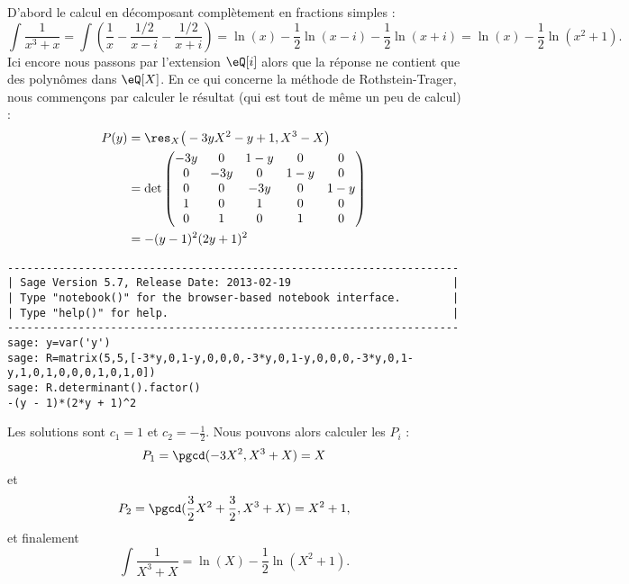 \begin{example}
    D'abord le calcul en décomposant complètement en fractions simples :
    \begin{equation}
        \int\frac{1}{ x^3+x }=\int\left( \frac{1}{ x }-\frac{ 1/2 }{ x-i }-\frac{ 1/2 }{ x+i } \right)=\ln(x)-\frac{ 1 }{2}\ln(x-i)-\frac{ 1 }{2}\ln(x+i)=\ln(x)-\frac{ 1 }{2}\ln(x^2+1).
    \end{equation}
    Ici encore nous passons par l'extension \( \eQ[i]\) alors que la réponse ne contient que des polynômes dans \( \eQ[X]\). En ce qui concerne la méthode de Rothstein-Trager, nous commençons par calculer le résultat (qui est tout de même un peu de calcul) :
    \begin{subequations}
        \begin{align}
        P(y)&=\res_X\big( -3yX^2-y+1,X^3-X \big)\\
        &=\det\begin{pmatrix}
            -3y    &   0    &   1-y    &   0    &   0\\  
            0    &   -3y    &   0    &   1-y    &   0\\  
            0    &   0    &   -3y    &   0    &   1-y\\  
            1    &   0    &   1    &   0    &   0\\  
            0    &   1    &   0    &   1    &   0    
        \end{pmatrix}\\
        &=-(y-1)^2(2y+1)^2
        \end{align}
    \end{subequations}
    
    \begin{verbatim}
----------------------------------------------------------------------
| Sage Version 5.7, Release Date: 2013-02-19                         |
| Type "notebook()" for the browser-based notebook interface.        |
| Type "help()" for help.                                            |
----------------------------------------------------------------------
sage: y=var('y')
sage: R=matrix(5,5,[-3*y,0,1-y,0,0,0,-3*y,0,1-y,0,0,0,-3*y,0,1-y,1,0,1,0,0,0,1,0,1,0])
sage: R.determinant().factor()                                                        
-(y - 1)*(2*y + 1)^2
    \end{verbatim}
    Les solutions sont \( c_1=1\) et \( c_2=-\frac{ 1 }{2}\). Nous pouvons alors calculer les \( P_i\) :
    \begin{equation}
        P_1=\pgcd(-3X^2,X^3+X)=X
    \end{equation}
    et
    \begin{equation}
        P_2=\pgcd(\frac{ 3 }{2}X^2+\frac{ 3 }{2},X^3+X)=X^2+1,
    \end{equation}
    et finalement
    \begin{equation}
        \int\frac{ 1 }{ X^3+X }=\ln(X)-\frac{ 1 }{2}\ln(X^2+1).
    \end{equation}
\end{example}

